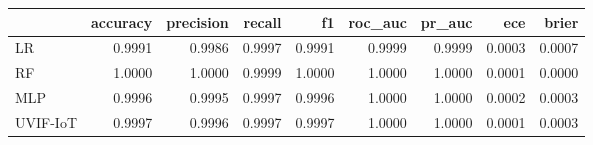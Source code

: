 \begin{tabular}{lrrrrrrrr}
\toprule
 & accuracy & precision & recall & f1 & roc_auc & pr_auc & ece & brier \\
\midrule
LR & 0.9991 & 0.9986 & 0.9997 & 0.9991 & 0.9999 & 0.9999 & 0.0003 & 0.0007 \\
RF & 1.0000 & 1.0000 & 0.9999 & 1.0000 & 1.0000 & 1.0000 & 0.0001 & 0.0000 \\
MLP & 0.9996 & 0.9995 & 0.9997 & 0.9996 & 1.0000 & 1.0000 & 0.0002 & 0.0003 \\
UVIF-IoT & 0.9997 & 0.9996 & 0.9997 & 0.9997 & 1.0000 & 1.0000 & 0.0001 & 0.0003 \\
\bottomrule
\end{tabular}
